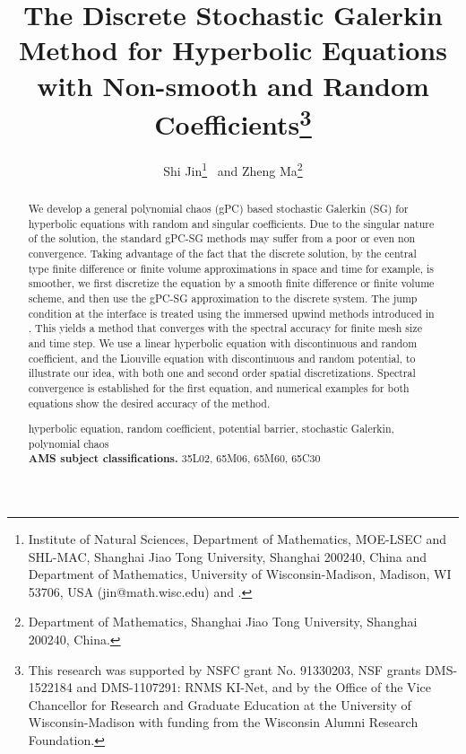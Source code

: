 \documentclass[12pt]{article}
\theoremstyle{plain}
\theoremstyle{remark}
\theoremstyle{remark}
\theoremstyle{remark}
\numberwithin{equation}{section}
\begin{document}
\title{\bf The Discrete Stochastic Galerkin Method for Hyperbolic Equations
with Non-smooth and Random Coefficients\footnote{This research was supported by NSFC grant No. 91330203, NSF
grants DMS-1522184 and DMS-1107291: RNMS KI-Net, and by the Office
of the Vice Chancellor for Research and Graduate Education at the University of Wisconsin-Madison with
funding from the Wisconsin Alumni Research Foundation.}}

\vspace{1cm}
\author{Shi Jin\footnote{ Institute of Natural Sciences, Department of Mathematics, MOE-LSEC and SHL-MAC, Shanghai Jiao Tong University, Shanghai 200240, China and Department of Mathematics, University of Wisconsin-Madison, Madison, WI 53706, USA (jin@math.wisc.edu) and .} \ and Zheng Ma\footnote{Department of Mathematics, Shanghai Jiao Tong University, Shanghai 200240, China.}}

\maketitle

\begin{abstract}
\noindent 
We develop a general polynomial chaos (gPC) based stochastic Galerkin (SG) for
hyperbolic equations with random and singular coefficients. Due to the singular nature of the solution, the standard gPC-SG methods may suffer from a poor or even
non convergence. Taking advantage of the fact that the discrete solution,
by the central type  finite difference or finite volume approximations
in space and time for example, 
is smoother, we first discretize the equation by a smooth finite difference or
finite volume scheme, and then use the gPC-SG approximation to the discrete
system. The jump condition at the interface is treated using the immersed
upwind methods introduced in \cite{Jin:2009pro, Wen:2005ueba}.
This yields a method that converges with the spectral accuracy
for finite mesh size and time step.  We use a linear hyperbolic equation
with discontinuous and random coefficient, and the Liouville equation with
discontinuous and random potential, to illustrate our idea, with both one
and second order spatial discretizations. Spectral convergence is established 
for the first equation, and numerical examples for both equations show the
desired accuracy of the method.

\bigskip

 hyperbolic equation, random coefficient, potential barrier, stochastic Galerkin, polynomial chaos\\
{\bf AMS subject classifications.} 35L02, 65M06, 65M60, 65C30\\
\end{abstract}
\end{document}
